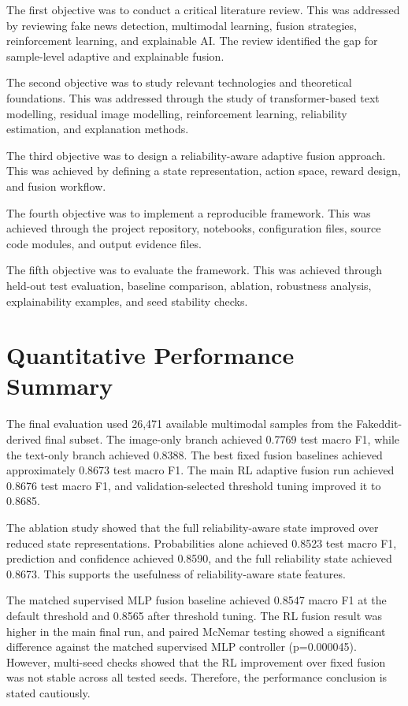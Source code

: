 The first objective was to conduct a critical literature review. This was addressed by reviewing fake news detection, multimodal learning, fusion strategies, reinforcement learning, and explainable AI. The review identified the gap for sample-level adaptive and explainable fusion.


The second objective was to study relevant technologies and theoretical foundations. This was addressed through the study of transformer-based text modelling, residual image modelling, reinforcement learning, reliability estimation, and explanation methods.


The third objective was to design a reliability-aware adaptive fusion approach. This was achieved by defining a state representation, action space, reward design, and fusion workflow.


The fourth objective was to implement a reproducible framework. This was achieved through the project repository, notebooks, configuration files, source code modules, and output evidence files.


The fifth objective was to evaluate the framework. This was achieved through held-out test evaluation, baseline comparison, ablation, robustness analysis, explainability examples, and seed stability checks.


\section{Quantitative Performance Summary}


The final evaluation used 26,471 available multimodal samples from the Fakeddit-derived final subset. The image-only branch achieved 0.7769 test macro F1, while the text-only branch achieved 0.8388. The best fixed fusion baselines achieved approximately 0.8673 test macro F1. The main RL adaptive fusion run achieved 0.8676 test macro F1, and validation-selected threshold tuning improved it to 0.8685.


The ablation study showed that the full reliability-aware state improved over reduced state representations. Probabilities alone achieved 0.8523 test macro F1, prediction and confidence achieved 0.8590, and the full reliability state achieved 0.8673. This supports the usefulness of reliability-aware state features.


The matched supervised MLP fusion baseline achieved 0.8547 macro F1 at the default threshold and 0.8565 after threshold tuning. The RL fusion result was higher in the main final run, and paired McNemar testing showed a significant difference against the matched supervised MLP controller (p=0.000045). However, multi-seed checks showed that the RL improvement over fixed fusion was not stable across all tested seeds. Therefore, the performance conclusion is stated cautiously.


